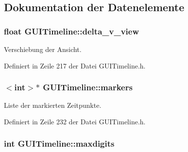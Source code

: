 \subsection{Dokumentation der Datenelemente}
\hypertarget{classGUITimeline_aba3c330e3e9e5f2f5edb069ecbb9c488}{
\subsubsection[{delta\-\_\-v\-\_\-view}]{\setlength{\rightskip}{0pt plus 5cm}float G\-U\-I\-Timeline\-::delta\-\_\-v\-\_\-view\hspace{0.3cm}{\ttfamily [private]}}}\label{classGUITimeline_aba3c330e3e9e5f2f5edb069ecbb9c488}


Verschiebung der Ansicht. 



Definiert in Zeile 217 der Datei G\-U\-I\-Timeline.\-h.

\hypertarget{classGUITimeline_a8e20b6ed00d7c48716256fffdcfa608a}{
\subsubsection[{markers}]{$<$int$>$$\ast$ G\-U\-I\-Timeline\-::markers\hspace{0.3cm}{\ttfamily [private]}}}\label{classGUITimeline_a8e20b6ed00d7c48716256fffdcfa608a}


Liste der markierten Zeitpunkte. 



Definiert in Zeile 232 der Datei G\-U\-I\-Timeline.\-h.

\hypertarget{classGUITimeline_a880c85a1838b77e7dd2c03601c15e36b}{
\subsubsection[{maxdigits}]{\setlength{\rightskip}{0pt plus 5cm}int G\-U\-I\-Timeline\-::maxdigits\hspace{0.3cm}{\ttfamily [private]}}}\label{classGUITimeline_a880c85a1838b77e7dd2c03601c15e36b}


